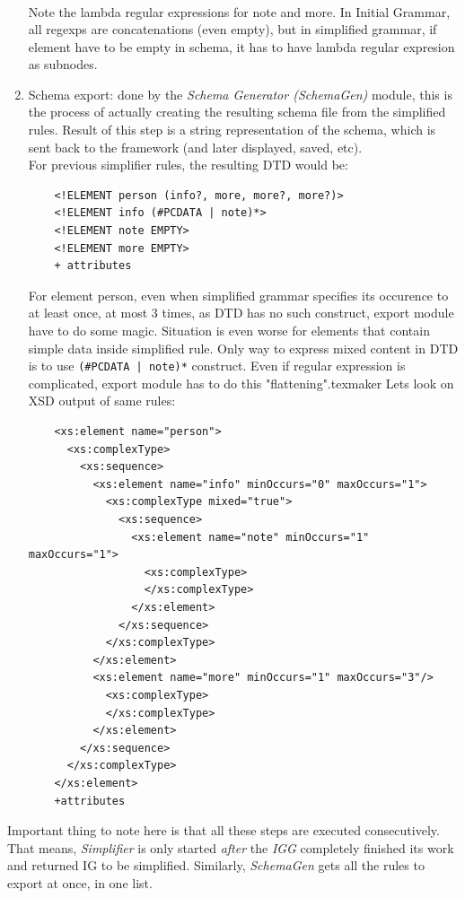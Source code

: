 \documentclass[a4paper,10pt,oneside]{article}
\newcommand{\jmodule}[1]{\emph{#1}}
\begin{document}
\begin{enumerate}
\begin{eqnarray*}
	\end{eqnarray*}
	Note the lambda regular expressions for note and more. In Initial Grammar, all regexps are concatenations (even empty), but in simplified grammar, if element have to be empty in schema, it has to have lambda regular expresion as subnodes.	
	\item Schema export: done by the \jmodule{Schema Generator (SchemaGen)} module, this is the process of actually creating the resulting schema file from the simplified rules. Result of this step is a string representation of the schema, which is sent back to the framework (and later displayed, saved, etc).\\
	For previous simplifier rules, the resulting DTD would be:
	\begin{verbatim}
	<!ELEMENT person (info?, more, more?, more?)>
	<!ELEMENT info (#PCDATA | note)*>
	<!ELEMENT note EMPTY>
	<!ELEMENT more EMPTY>
	+ attributes
	\end{verbatim}
	For element person, even when simplified grammar specifies its occurence to at least once, at most 3 times, as DTD has no such construct, export module have to do some magic. Situation is even worse for elements that contain simple data inside simplified rule. Only way to express mixed content in DTD is to use \verb.(#PCDATA | note)*. construct. Even if regular expression is complicated, export module has to do this "flattening".texmaker
	Lets look on XSD output of same rules:
	\begin{verbatim}
	<xs:element name="person">
	  <xs:complexType>
	    <xs:sequence>
	      <xs:element name="info" minOccurs="0" maxOccurs="1">
	        <xs:complexType mixed="true">
	          <xs:sequence>
	            <xs:element name="note" minOccurs="1" maxOccurs="1">
	              <xs:complexType>
	              </xs:complexType>
	            </xs:element>
	          </xs:sequence>
	        </xs:complexType>
	      </xs:element>
	      <xs:element name="more" minOccurs="1" maxOccurs="3"/>
	        <xs:complexType>
	        </xs:complexType>
	      </xs:element>
	    </xs:sequence>
	  </xs:complexType>
	</xs:element>
	+attributes
	\end{verbatim}
\end{enumerate}
Important thing to note here is that all these steps are executed consecutively. That means, \jmodule{Simplifier} is only started \emph{after} the \jmodule{IGG} completely finished its work and returned IG to be simplified. Similarly, \jmodule{SchemaGen} gets all the rules to export at once, in one list.
\end{document}
